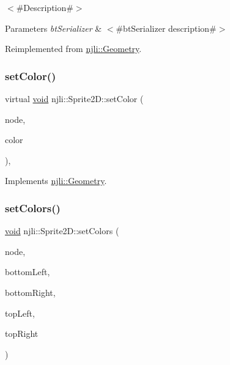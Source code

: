 $<$\#\+Description\#$>$


\begin{DoxyParams}{Parameters}
{\em bt\+Serializer} & $<$\#bt\+Serializer description\#$>$ \\
\hline
\end{DoxyParams}


Reimplemented from \mbox{\hyperlink{classnjli_1_1_geometry_a42a35911278eb52e0013d6dadd80271d}{njli\+::\+Geometry}}.

\mbox{\label{classnjli_1_1_sprite2_d_a5b32ecafaa923c27662db4ae37286815}} 
\subsubsection{\texorpdfstring{set\+Color()}{setColor()}}
{\footnotesize\ttfamily virtual \mbox{\hyperlink{_thread_8h_af1e856da2e658414cb2456cb6f7ebc66}{void}} njli\+::\+Sprite2\+D\+::set\+Color (\begin{DoxyParamCaption}\item[{\mbox{\hyperlink{classnjli_1_1_node}{Node}} $\ast$}]{node,  }\item[{const bt\+Vector4 \&}]{color }\end{DoxyParamCaption})\hspace{0.3cm}{\ttfamily [protected]}, {\ttfamily [virtual]}}



Implements \mbox{\hyperlink{classnjli_1_1_geometry_a6ba967a65603a7660ab63fe067e338b4}{njli\+::\+Geometry}}.

\mbox{\label{classnjli_1_1_sprite2_d_a0e06bbf2ab717c55c8ec8483ab6d8157}} 
\subsubsection{\texorpdfstring{set\+Colors()}{setColors()}\hspace{0.1cm}{\footnotesize\ttfamily [1/2]}}
{\footnotesize\ttfamily \mbox{\hyperlink{_thread_8h_af1e856da2e658414cb2456cb6f7ebc66}{void}} njli\+::\+Sprite2\+D\+::set\+Colors (\begin{DoxyParamCaption}\item[{\mbox{\hyperlink{classnjli_1_1_node}{Node}} $\ast$}]{node,  }\item[{const bt\+Vector4 \&}]{bottom\+Left,  }\item[{const bt\+Vector4 \&}]{bottom\+Right,  }\item[{const bt\+Vector4 \&}]{top\+Left,  }\item[{const bt\+Vector4 \&}]{top\+Right }\end{DoxyParamCaption})}

